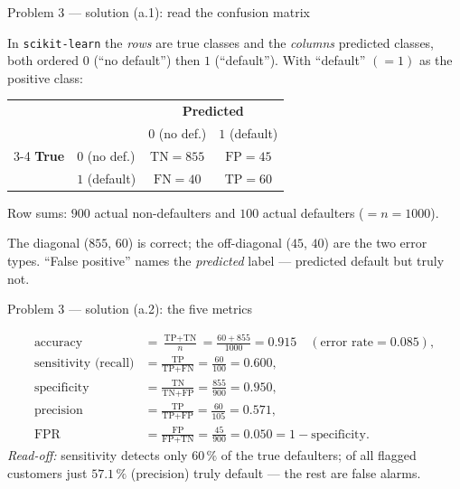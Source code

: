 \documentclass[aspectratio=169,11pt]{beamer}
\begin{document}
\begin{frame}{Problem 3 --- solution (a.1): read the confusion matrix}
  \begin{solutionbox}
    In \texttt{scikit-learn} the \emph{rows} are true classes and the \emph{columns}
    predicted classes, both ordered $0$ (``no default'') then $1$ (``default''). With
    ``default'' $(=1)$ as the positive class:
    \begin{center}
    \renewcommand{\arraystretch}{1.1}
    \begin{tabular}{ll|cc}
      \multicolumn{2}{c}{} & \multicolumn{2}{c}{\textbf{Predicted}}\\
      \multicolumn{2}{c|}{} & $0$ (no def.) & $1$ (default)\\
      \cline{3-4}
      \textbf{True} & $0$ (no def.) & $\text{TN}=855$ & $\text{FP}=45$\\
                    & $1$ (default) & $\text{FN}=40$  & $\text{TP}=60$\\
    \end{tabular}
    \end{center}
    Row sums: $900$ actual non-defaulters and $100$ actual defaulters ($=n=1000$).
  \end{solutionbox}
  \begin{takeaway}[Mnemonic]
    The diagonal ($855$, $60$) is correct; the off-diagonal ($45$, $40$) are the two error
    types. ``False positive'' names the \emph{predicted} label --- predicted default but
    truly not.
  \end{takeaway}
\end{frame}

\begin{frame}{Problem 3 --- solution (a.2): the five metrics}
  \begin{solutionbox}
    \begin{align*}
      \text{accuracy} &= \frac{\text{TP}+\text{TN}}{n}=\frac{60+855}{1000}=\mathbf{0.915}
        \quad(\text{error rate}=0.085),\\
      \text{sensitivity (recall)} &= \frac{\text{TP}}{\text{TP}+\text{FN}}=\frac{60}{100}=\mathbf{0.600},\\
      \text{specificity} &= \frac{\text{TN}}{\text{TN}+\text{FP}}=\frac{855}{900}=\mathbf{0.950},\\
      \text{precision} &= \frac{\text{TP}}{\text{TP}+\text{FP}}=\frac{60}{105}=\mathbf{0.571},\\
      \text{FPR} &= \frac{\text{FP}}{\text{FP}+\text{TN}}=\frac{45}{900}=\mathbf{0.050}=1-\text{specificity}.
    \end{align*}
    \emph{Read-off:} sensitivity detects only $60\,\%$ of the true defaulters; of all flagged
    customers just $57.1\,\%$ (precision) truly default --- the rest are false alarms.
  \end{solutionbox}
\end{frame}
\end{document}
